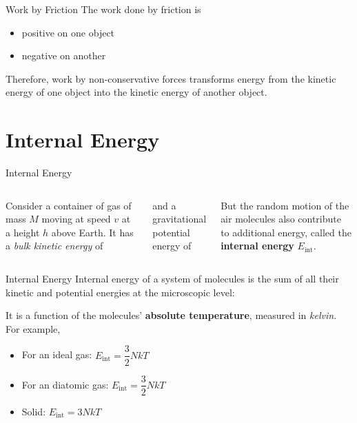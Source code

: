 \documentclass[12pt,compress,aspectratio=169]{beamer}
\begin{document}
\begin{frame}{Work by Friction}
  The work done by friction is
  \begin{itemize}
  \item positive on one object
  \item negative on another
  \end{itemize}
  Therefore, work by non-conservative forces transforms energy from the kinetic
  energy of one object into the kinetic energy of another object.
\end{frame}




\section{Internal Energy}

\begin{frame}{Internal Energy}
  \begin{columns}

    Consider a container of gas of mass $M$ moving at speed $v$ at a height $h$
    above Earth. It has a \emph{bulk kinetic energy} of

    
    and a gravitational potential energy of


    But the random motion of the air molecules also contribute to additional
    energy, called the \textbf{internal energy} $E_\text{int}$.
  \end{columns}
\end{frame}



\begin{frame}{Internal Energy}
  Internal energy of a system of molecules is the sum of all their kinetic and
  potential energies at the microscopic level:


  It is a function of the molecules' \textbf{absolute temperature}, measured in
  \emph{kelvin}. For example, 
  \begin{itemize}
  \item For an ideal gas: $E_\text{int}=\dfrac32NkT$
  \item For an diatomic gas: $E_\text{int}=\dfrac32NkT$
  \item Solid: $E_\text{int}=3NkT$
  \end{itemize}
\end{frame}
\end{document}
